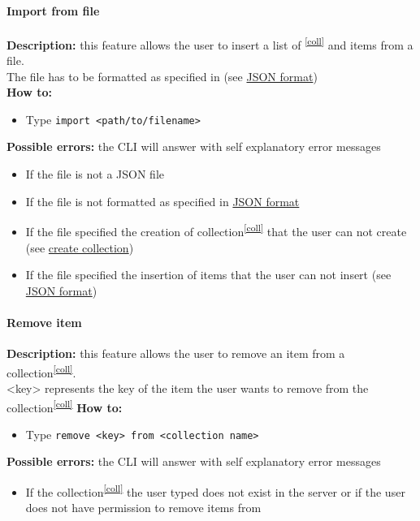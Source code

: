 \documentclass{scalatekids-article}
\begin{document}
\paragraph{Import from file}
\label{sec:import}
\textbf{Description:} this feature allows the user to insert a list of \textsuperscript{\ref{coll}} and items from a file.\\
The file has to be formatted as specified in (see \hyperref[sec:JSONFormat]{JSON format})\\%
\textbf{How to:}
\begin{itemize}
\item Type \texttt{import <path/to/filename>}
\end{itemize}
\textbf{Possible errors:} the CLI will answer with self explanatory error messages
\begin{itemize}
\item If the file is not a JSON file
\item If the file is not formatted as specified in \hyperref[sec:JSONFormat]{JSON format}%
\item If the file specified the creation of collection\textsuperscript{\ref{coll}} that the user can not create (see \hyperref[sec:createcollection]{create collection})
\item If the file specified the insertion of items that the user can not insert (see \hyperref[sec:JSONFormat]{JSON format})
\end{itemize}

\paragraph{Remove item}
\label{sec:removeitem}
\textbf{Description:} this feature allows the user to remove an item from a collection\textsuperscript{\ref{coll}}.\\
<key> represents the key of the item the user wants to remove from the collection\textsuperscript{\ref{coll}}
\textbf{How to:}
\begin{itemize}
\item Type \texttt{remove <key> from <collection name>}
\end{itemize}
\textbf{Possible errors:} the CLI will answer with self explanatory error messages
\begin{itemize}
\item If the collection\textsuperscript{\ref{coll}} the user typed does not exist in the server or if the user does not have permission to remove items from
\end{itemize}
\end{document}
